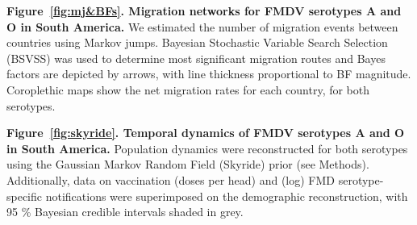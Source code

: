 \documentclass[10pt]{article}
\begin{document}
{\bf Figure~\ref{fig:mj&BFs}. Migration networks for FMDV serotypes A and O in South America.} We estimated the number of migration events between countries using Markov jumps.
Bayesian Stochastic Variable Search Selection (BSVSS) was used to determine most significant migration routes and Bayes factors are depicted by arrows, with line thickness proportional to BF magnitude.
Coroplethic maps show the net migration rates for each country, for both serotypes.

{\bf Figure~\ref{fig:skyride}. Temporal dynamics of FMDV serotypes A and O in South America.} Population dynamics were reconstructed for both serotypes using the Gaussian Markov Random Field (Skyride) prior (see Methods).
Additionally, data on vaccination  (doses per head) and (log) FMD serotype-specific notifications were superimposed on the demographic reconstruction, with 95 \% Bayesian credible intervals shaded in grey.

\newpage
\end{document}
